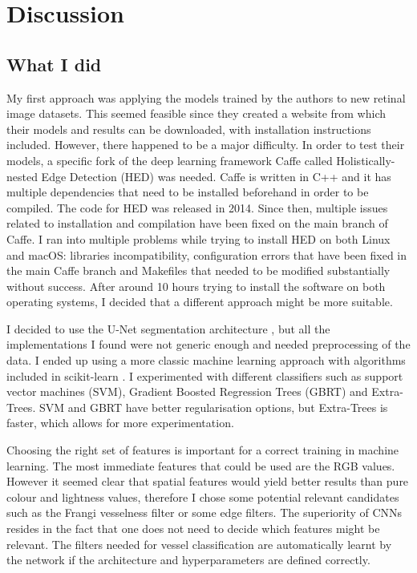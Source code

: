 \section{Discussion}


\subsection{What I did}

My first approach was applying the models trained by the authors to new retinal image datasets. This seemed feasible since they created a website from which their models and results can be downloaded, with installation instructions included. However, there happened to be a major difficulty. In order to test their models, a specific fork of the deep learning framework Caffe \cite{jia_caffe:_2014} called Holistically-nested Edge Detection (HED) \cite{xie_holistically-nested_2015} was needed. Caffe is written in C++ and it has multiple dependencies that need to be installed beforehand in order to be compiled. The code for HED was released in 2014. Since then, multiple issues related to installation and compilation have been fixed on the main branch of Caffe. I ran into multiple problems while trying to install HED on both Linux and macOS: libraries incompatibility, configuration errors that have been fixed in the main Caffe branch and Makefiles that needed to be modified substantially without success. After around 10 hours trying to install the software on both operating systems, I decided that a different approach might be more suitable.

I decided to use the U-Net segmentation architecture \cite{ronneberger_u-net:_2015}, but all the implementations I found were not generic enough and needed preprocessing of the data. I ended up using a more classic machine learning approach with algorithms included in scikit-learn \cite{pedregosa_scikit-learn:_2011}. I experimented with different classifiers such as support vector machines (SVM), Gradient Boosted Regression Trees (GBRT) and Extra-Trees. SVM and GBRT have better regularisation options, but Extra-Trees is faster, which allows for more experimentation.

Choosing the right set of features is important for a correct training in machine learning. The most immediate features that could be used are the RGB values. However it seemed clear that spatial features would yield better results than pure colour and lightness values, therefore I chose some potential relevant candidates such as the Frangi vesselness filter or some edge filters. The superiority of CNNs resides in the fact that one does not need to decide which features might be relevant. The filters needed for vessel classification are automatically learnt by the network if the architecture and hyperparameters are defined correctly.


